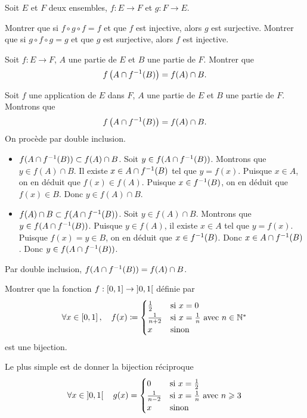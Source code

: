 \documentclass{magnolia}
\begin{document}
Soit $E$ et $F$ deux ensembles, $f:E\to F$ et $g:F\to E$.
\begin{questions}
\question Montrer que si $f\circ g\circ f=f$ et que $f$ est injective, alors $g$ est surjective.
\question Montrer que si $g\circ f\circ g=g$ et que $g$ est surjective, alors $f$ est
injective.
\end{questions}

Soit $f:E\to F$, $A$ une partie de $E$ et $B$ une partie de $F$. Montrer que
\[f\left(A\cap f^{-1} (B)\right)=f(A)\cap B.\]
\begin{sol}
Soit $f$ une application de $E$ dans $F$, $A$ une partie de $E$ et $B$ une partie de $F$. Montrons que 
\[f\left(A\cap f^{-1} (B)\right)=f(A)\cap B.\]
On procède par double inclusion.
\begin{itemize}
\item $f(A\cap f^{-1} (B))\subset f(A)\cap B$. Soit $y\in f(A\cap f^{-1} (B))$. Montrons que $y\in f(A)\cap B$. Il existe $x\in A\cap f^{-1} (B)$ tel que $y=f(x)$. Puisque $x\in A$, on en déduit que $f(x)\in f(A)$. Puisque $x\in f^{-1} (B)$, on en déduit que $f(x)\in B$. Donc $y\in f(A)\cap B$.
\item $f(A)\cap B\subset f(A\cap f^{-1} (B))$. Soit $y\in f(A)\cap B$. Montrons que $y\in f(A\cap f^{-1} (B))$. Puisque $y\in f(A)$, il existe $x\in A$ tel que $y=f(x)$. Puisque $f(x)=y\in B$, on en déduit que $x\in f^{-1}(B)$. Donc $x\in A\cap f^{-1}(B)$. Donc $y\in f(A\cap f^{-1}(B))$.
\end{itemize}
Par double inclusion, $f(A\cap f^{-1} (B))= f(A)\cap B$.
\end{sol}


Montrer que la fonction $f:\left[0,1\right] \rightarrow \left]0,1\right[$ définie
par
\[\forall x\in\left[0,1\right] ,\quad f(x)\coloneqq
  \begin{cases}
  \frac{1}{2} & \text{si $x=0$}\\
  \frac{1}{n+2} & \text{si $x=\frac{1}{n}$ avec $n\in{\mathbb{N}^*}$}\\
  x  &\text{sinon}
  \end{cases}\]
est une bijection.
\begin{sol}
Le plus simple est de donner la bijection réciproque
\[\forall x\in\left]0,1\right[ \quad g(x)=
  \begin{cases}
  0 & \text{si $x=\frac{1}{2}$}\\
  \frac{1}{n-2} & \text{si $x=\frac{1}{n}$ avec $n\geqslant 3$}\\
  x  &\text{sinon}
  \end{cases}\]
\end{sol}
\end{document}
